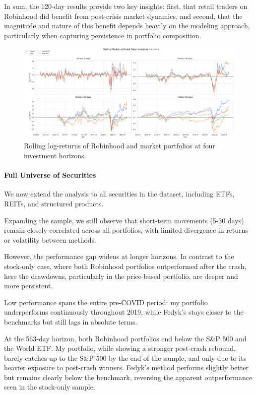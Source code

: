 In sum, the 120-day results provide two key insights: first, that retail traders on Robinhood did benefit from post-crisis market dynamics, and second, that the magnitude and nature of this benefit depends heavily on the modeling approach, particularly when capturing persistence in portfolio composition.

\begin{figure}[H]
    \centering
    \includegraphics[width=1\linewidth]
    {../images/returns/comparison_1.png}
    \caption{Rolling log-returns of Robinhood and market portfolios at four investment horizons.}
\end{figure}

\paragraph{Full Universe of Securities}

We now extend the analysis to all securities in the dataset, including ETFs, REITs, and structured products.

Expanding the sample, we still observe that short-term movements (5-30 days) remain closely correlated across all portfolios, with limited divergence in returns or volatility between methods.

However, the performance gap widens at longer horizons. 
In contrast to the stock-only case, where both Robinhood portfolios outperformed after the crash, here the drawdowns, particularly in the price-based portfolio, are deeper and more persistent.

Low performance spans the entire pre-COVID period: my portfolio underperforms continuously throughout 2019, while Fedyk's stays closer to the benchmarks but still lags in absolute terms.

At the 563-day horizon, both Robinhood portfolios end below the S\&P 500 and the World ETF.
My portfolio, while showing a stronger post-crash rebound, barely catches up to the S\&P 500 by the end of the sample, and only due to its heavier exposure to post-crash winners.
Fedyk's method performs slightly better but remains clearly below the benchmark, reversing the apparent outperformance seen in the stock-only sample.

